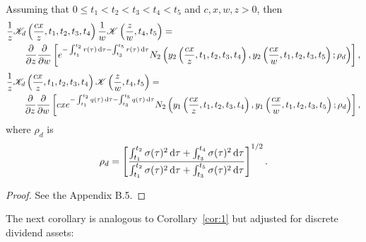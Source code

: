 	\begin{lemma}
		\label{lem:B5}
		Assuming that $0 \leq t_1 < t_2 < t_3 < t_4 < t_5$ and $c,x,w,z > 0$, then
		\begin{equation}
			\label{eqn:KK3}
		\begin{split}
			&\frac{1}{z}\mathscr K_d\left(\frac{cx}{z}, t_1, t_2, t_3, t_4\right)\frac{1}{w}\mathscr K\left( \frac{z}{w}, t_4, t_5 \right) =  \\
			&\qquad \frac{\partial}{\partial z}\frac{\partial}{\partial w}\left[ e^{-\int_{t_1}^{t_2} r(\tau) \,\mathrm d\tau-\int_{t_3}^{t_5} r(\tau) \, \mathrm d\tau}  N_2\left( y_2\left(\frac{cx}{z}, t_1, t_2, t_3, t_4\right), y_2\left( \frac{cx}{w}, t_1, t_2, t_3, t_5 \right); \rho_d \right)\right],
		\end{split}
		\end{equation}
		\begin{equation}
			\label{eqn:KK4}
		\begin{split}
			&\frac{1}{z}\mathscr K_d\left(\frac{cx}{z}, t_1, t_2, t_3, t_4\right)\mathscr K\left( \frac{z}{w}, t_4, t_5 \right) =  \\
			&\qquad \frac{\partial}{\partial z}\frac{\partial}{\partial w}\left[ cxe^{-\int_{t_1}^{t_2} q(\tau) \,\mathrm d\tau-\int_{t_3}^{t_5} q(\tau) \, \mathrm d\tau}  N_2\left( y_1\left(\frac{cx}{z}, t_1, t_2, t_3, t_4\right), y_1\left( \frac{cx}{w}, t_1, t_2, t_3, t_5 \right); \rho_d \right)\right],
		\end{split}
		\end{equation}
		where $\rho_d$ is
			\begin{equation}
				\label{eqn:rhod}
				\rho_d = \left[ \frac{\int_{t_1}^{t_2} \sigma(\tau)^2 \, \mathrm d\tau + \int_{t_3}^{t_4} \sigma(\tau)^2 \, \mathrm d\tau}{\int_{t_1}^{t_2} \sigma(\tau)^2 \, \mathrm d\tau + \int_{t_3}^{t_5} \sigma(\tau)^2 \, \mathrm d\tau} \right]^{1/2}.
			\end{equation}
	\end{lemma}
	\begin{proof}
		See the Appendix B.5.
	\end{proof}
\noindent The next corollary is analogous to Corollary~\ref{cor:1} but adjusted for discrete dividend assets:
